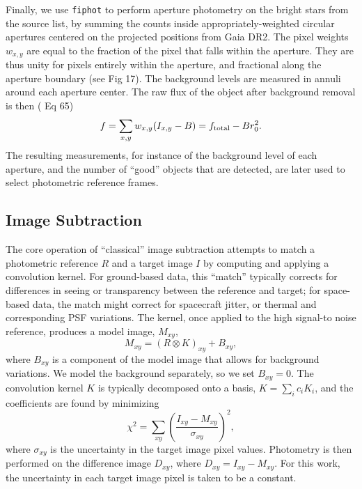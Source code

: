 \documentclass[12pt,twocolumn,tighten]{aastex62}
\begin{document}
Finally, we use \texttt{fiphot} to perform aperture photometry on the
bright stars from the
source list, by summing the counts inside appropriately-weighted
circular apertures centered on the projected positions from Gaia DR2. 
The pixel weights $w_{x,y}$ are equal to the fraction of the pixel
that falls within the aperture.  They are thus unity for pixels
entirely within the aperture, and fractional along the aperture
boundary (see \citealt{Pal_2009} Fig 17). 
The background levels are measured in annuli around each aperture
center.  The raw flux of the object after background removal is then
(\citealt{Pal_2009} Eq 65)
\begin{equation}
  f = \sum_{x,y} w_{x,y} (I_{x,y} - B) = f_{\rm total} - B r_0^2.
  \label{eq:simple_aperture_phot}
\end{equation}
The resulting measurements, for instance of the background level of
each aperture, and the number of ``good'' objects that are detected,
are later used to select photometric reference frames.


\subsection{Image Subtraction}
\label{subsec:imagesubtraction}

The core operation of ``classical'' image subtraction
attempts to match a photometric reference $R$ and a target image $I$ by 
computing and applying a convolution kernel.
For ground-based data, this ``match'' typically corrects for
differences in seeing or transparency between the reference and
target; for space-based data, the match might correct for spacecraft
jitter, or thermal and corresponding PSF variations.
The kernel, once applied to the high signal-to noise reference,
produces a model image, $M_{xy}$,
\begin{equation}
    M_{xy} = (R \otimes K)_{xy} + B_{xy},
\end{equation}
where $B_{xy}$ is a component of the model image that allows for
background variations.
We model the background separately, so we set $B_{xy}=0$.
The convolution kernel $K$ is typically decomposed onto a
basis, $K = \sum_i c_i K_i$, and the coefficients are found
by minimizing
\begin{equation}
    \chi^2 = \sum_{xy} \left( \frac{I_{xy} - M_{xy}}{\sigma_{xy}} \right)^2,
    \label{eq:chisq_conv}
\end{equation}
where $\sigma_{xy}$ is the uncertainty in the target image pixel values.
Photometry is then performed on the difference image $D_{xy}$, where
$D_{xy} = I_{xy} - M_{xy}$.
For this work, the uncertainty in each target image pixel is
taken to be a constant.	
\end{document}
